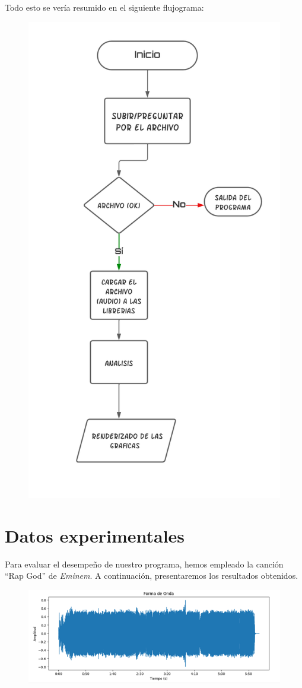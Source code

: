 \documentclass[letterpaper, 12pt]{article}
\begin{document}
Todo esto se vería resumido en el siguiente flujograma:

\begin{figure}[H]
	\begin{center}
		\includegraphics[width=.6\linewidth]{./Images/Flujograma.png}
		\caption{}
	\end{center}
\end{figure}

\section*{Datos experimentales}

Para evaluar el desempeño de nuestro programa, hemos
empleado la canción ``Rap God'' de \textit{Eminem}. A
continuación, presentaremos los resultados obtenidos.

\begin{figure}[H]
	\begin{center}
		\includegraphics[width=.7\linewidth]{./Images/DatosExperimentales_1.png}
		\caption{}
	\end{center}
\end{figure}
\end{document}
